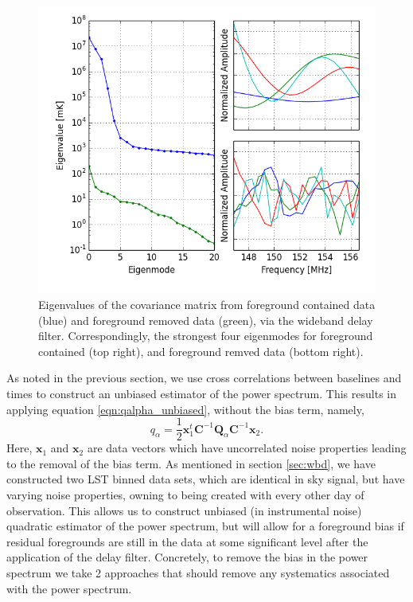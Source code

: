 \documentclass[twocolumn,numberedappendix]{emulateapj} \shorttitle{PSA64}
\newcommand{\x}{\mathbf{x}} \newcommand{\xhat}{\hat{\mathbf{x}}}
\begin{document}
\begin{figure}[t!]\centering
\includegraphics[width=1.5\columnwidth]{plots/eig.png}
\caption{Eigenvalues of the covariance matrix from foreground contained data
(blue) and foreground removed data (green), via the wideband delay filter.
Correspondingly, the strongest four eigenmodes for foreground contained (top
right), and foreground remved data (bottom right).}
\label{fig:eigs}
\end{figure}

As noted in the previous section, we use cross correlations between baselines
and times to construct an unbiased estimator of the power spectrum. This results
in applying equation \ref{eqn:qalpha_unbiased}, without the bias term, namely, 
\begin{equation}
    q_{\alpha} =
        \frac{1}{2}\x_{1}^{t}\mathbf{C}^{-1}\mathbf{Q}_{\alpha}\mathbf{C}^{-1}\x_{2}.
\end{equation}
Here, $\x_{1}$ and $\x_{2}$ are data vectors which have uncorrelated noise
properties leading to the removal of the bias term. As mentioned in section
\ref{sec:wbd}, we have constructed two LST binned data sets, which are identical
in sky signal, but have varying noise properties, owning to being created with
every other day of observation.  This allows us to construct unbiased (in
instrumental noise) quadratic estimator of the power spectrum, but will allow
for a foreground bias if residual foregrounds are still in the data at some
significant level after the application of the delay filter. Concretely, to
remove the bias in the power spectrum we take 2 approaches that should remove
any systematics associated with the power spectrum.
\end{document}
